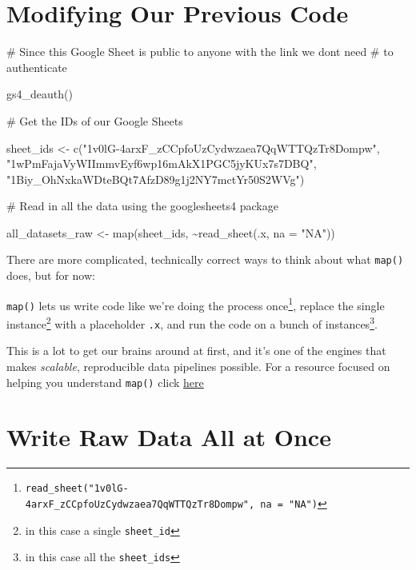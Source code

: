 \documentclass[
  letterpaper,
  DIV=11,
  numbers=noendperiod]{scrreprt}
\newenvironment{Shaded}{\begin{snugshade}}{\end{snugshade}}
\newcommand{\AttributeTok}[1]{\textcolor[rgb]{0.40,0.45,0.13}{#1}}
\newcommand{\CommentTok}[1]{\textcolor[rgb]{0.37,0.37,0.37}{#1}}
\newcommand{\FunctionTok}[1]{\textcolor[rgb]{0.28,0.35,0.67}{#1}}
\newcommand{\NormalTok}[1]{\textcolor[rgb]{0.00,0.23,0.31}{#1}}
\newcommand{\OtherTok}[1]{\textcolor[rgb]{0.00,0.23,0.31}{#1}}
\newcommand{\SpecialCharTok}[1]{\textcolor[rgb]{0.37,0.37,0.37}{#1}}
\newcommand{\StringTok}[1]{\textcolor[rgb]{0.13,0.47,0.30}{#1}}
\begin{document}
\hypertarget{modifying-our-previous-code}{%
\section{Modifying Our Previous
Code}\label{modifying-our-previous-code}}

\begin{Shaded}
\begin{Highlighting}[]
\CommentTok{\# Since this Google Sheet is public to anyone with the link we don\textquotesingle{}t need}
\CommentTok{\# to authenticate}

\FunctionTok{gs4\_deauth}\NormalTok{()}

\CommentTok{\# Get the IDs of our Google Sheets}

\NormalTok{sheet\_ids }\OtherTok{\textless{}{-}} \FunctionTok{c}\NormalTok{(}\StringTok{"1v0lG{-}4arxF\_zCCpfoUzCydwzaea7QqWTTQzTr8Dompw"}\NormalTok{,}
               \StringTok{"1wPmFajaVyWIImmvEyf6wp16mAkX1PGC5jyKUx7s7DBQ"}\NormalTok{,}
               \StringTok{"1Biy\_OhNxkaWDteBQt7AfzD89g1j2NY7mctYr50S2WVg"}\NormalTok{)}

\CommentTok{\# Read in all the data using the googlesheets4 package}

\NormalTok{all\_datasets\_raw }\OtherTok{\textless{}{-}} \FunctionTok{map}\NormalTok{(sheet\_ids, }\SpecialCharTok{\textasciitilde{}}\FunctionTok{read\_sheet}\NormalTok{(.x, }\AttributeTok{na =} \StringTok{"NA"}\NormalTok{))}
\end{Highlighting}
\end{Shaded}

There are more complicated, technically correct ways to think about what
\texttt{map()} does, but for now:

\texttt{map()} lets us write code like we're doing the process
once\footnote{\texttt{read\_sheet("1v0lG-4arxF\_zCCpfoUzCydwzaea7QqWTTQzTr8Dompw",\ na\ =\ "NA")}},
replace the single instance\footnote{in this case a single
  \texttt{sheet\_id}} with a placeholder \texttt{.x}, and run the code
on a bunch of instances\footnote{in this case all the
  \texttt{sheet\_ids}}.

This is a lot to get our brains around at first, and it's one of the
engines that makes \emph{scalable}, reproducible data pipelines
possible. For a resource focused on helping you understand
\texttt{map()} click
\href{https://jennybc.github.io/purrr-tutorial/index.html}{here}

\hypertarget{write-raw-data-all-at-once}{%
\section{Write Raw Data All at Once}\label{write-raw-data-all-at-once}}
\end{document}
